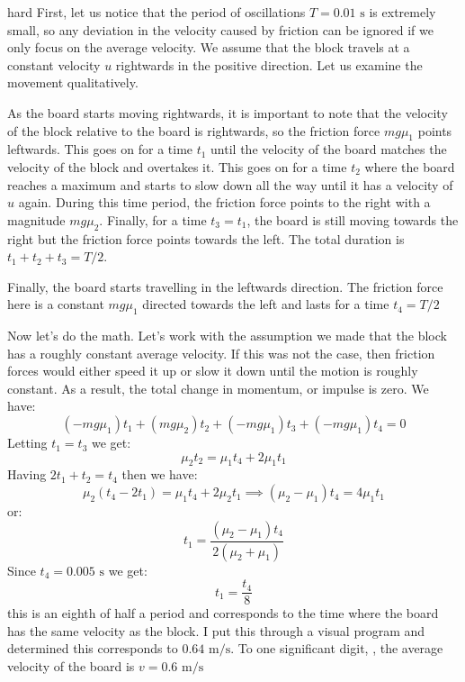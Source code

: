 \begin{solution}{hard} First, let us notice that the period of oscillations $T=0.01 \text{ s}$ is extremely small, so any deviation in the velocity caused by friction can be ignored if we only focus on the average velocity. We assume that the block travels at a constant velocity $u$ rightwards in the positive direction. Let us examine the movement qualitatively.
\vspace{3mm}

As the board starts moving rightwards, it is important to note that the velocity of the block relative to the board is rightwards, so the friction force $mg\mu_1$ points leftwards. This goes on for a time $t_1$ until the velocity of the board matches the velocity of the block and overtakes it. This goes on for a time $t_2$ where the board reaches a maximum and starts to slow down all the way until it has a velocity of $u$ again. During this time period, the friction force points to the right with a magnitude $mg\mu_2$. Finally, for a time $t_3=t_1$, the board is still moving towards the right but the friction force points towards the left. The total duration is $t_1+t_2+t_3=T/2$.
\vspace{3mm}

Finally, the board starts travelling in the leftwards direction. The friction force here is a constant $mg\mu_1$ directed towards the left and lasts for a time $t_4=T/2$
\vspace{3mm}

Now let's do the math. Let's work with the assumption we made that the block has a roughly constant average velocity. If this was not the case, then friction forces would either speed it up or slow it down until the motion is roughly constant. As a result, the total change in momentum, or impulse is zero. We have:
$$(-mg\mu_1)t_1+(mg\mu_2)t_2+(-mg\mu_1)t_3+(-mg\mu_1)t_4=0$$
Letting $t_1=t_3$ we get:
$$\mu_2t_2=\mu_1t_4+2\mu_1t_1$$
Having $2t_1+t_2=t_4$ then we have:
$$\mu_2(t_4-2t_1)=\mu_1t_4+2\mu_2t_1 \implies (\mu_2-\mu_1)t_4=4\mu_1t_1$$
or:
$$t_1 = \frac{(\mu_2-\mu_1)t_4}{2(\mu_2+\mu_1)}$$
Since $t_4=0.005 \text{ s}$ we get:
$$t_1 = \frac{t_4}{8}$$
this is an eighth of half a period and corresponds to the time where the board has the same velocity as the block. I put this through a visual program and determined this corresponds to $0.64 \text{ m/s}$. To one significant digit, , the average velocity of the board is $\boxed{v=0.6 \text{ m/s}}$
\end{solution}
